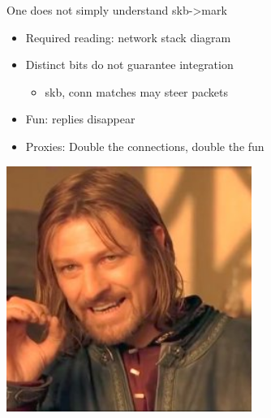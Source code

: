 \documentclass[black,white,aspectratio=169]{beamer}
\DeclareRobustCommand{\#}{\adjustbox{valign=B,totalheight=.57\baselineskip}{\oldhash}}%
\begin{document}
    \begin{frame}{One does not simply understand skb->mark}

        \vfill
        \begin{table}
            \begin{subtable}[l]{0.7\textwidth}
                \begin{itemize}
                    \item Required reading: network stack diagram~\medskip
                    \item Distinct bits do not guarantee integration~\smallskip
                    \begin{itemize}
                        \item skb, conn matches may steer packets~\medskip
                    \end{itemize}
                     \item Fun: replies disappear~\medskip
                     \item Proxies: Double the connections, double the fun~\medskip
                \end{itemize}
            \end{subtable}
            \begin{subtable}[r]{0.25\textwidth}
                \includegraphics[width=0.6\textwidth]{boromir.jpg}
            \end{subtable}
        \end{table}
        \vfill
    \end{frame}
\end{document}
